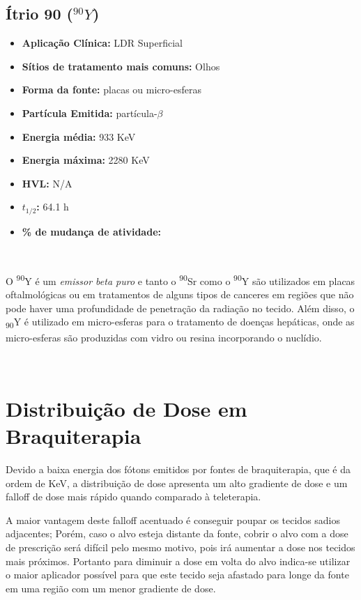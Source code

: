 \documentclass[11pt,a4paper]{article}
\begin{document}
		\subsection{Ítrio 90 \textbf{\textcolor{CarnationPink}{(${}^{90}Y$)}}}

			\begin{itemize}
				\item \textbf{Aplicação Clínica:} LDR Superficial
				\item \textbf{Sítios de tratamento mais comuns:} Olhos
				\item \textbf{Forma da fonte:} placas ou micro-esferas
				\item \textbf{Partícula Emitida:} partícula-$\beta$
				\item \textbf{Energia média: } 933 KeV 
				\item \textbf{Energia máxima: } 2280 KeV
				\item \textbf{HVL:} N/A
				\item \textbf{$t_{1/2}$:} 64.1 h
				\item \textbf{\% de mudança de atividade: } 
			\end{itemize}

		\

			O \textsuperscript{90}Y é um \textit{\textcolor{CarnationPink}{emissor beta puro}} e tanto o \textsuperscript{90}Sr como o \textsuperscript{90}Y são utilizados em placas oftalmológicas ou em tratamentos de alguns tipos de canceres em regiões que não pode haver uma profundidade de penetração da radiação no tecido. Além disso, o \textsubscript{90}Y é utilizado em micro-esferas para o tratamento de doenças hepáticas, onde as micro-esferas são produzidas com vidro ou resina incorporando o nuclídio.

		\

	\section{Distribuição de Dose em Braquiterapia}

		Devido a baixa energia dos fótons emitidos por fontes de braquiterapia, que é da ordem de KeV, a distribuição de dose apresenta um alto gradiente de dose e um falloff de dose mais rápido quando comparado à teleterapia.

		A maior vantagem deste falloff acentuado é conseguir poupar os tecidos sadios adjacentes; Porém, caso o alvo esteja distante da fonte, cobrir o alvo com a dose de prescrição será difícil pelo mesmo motivo, pois irá aumentar a dose nos tecidos mais próximos. Portanto para diminuir a dose em volta do alvo indica-se utilizar o maior aplicador possível para que este tecido seja afastado para longe da fonte em uma região com um menor gradiente de dose. 
\end{document}
